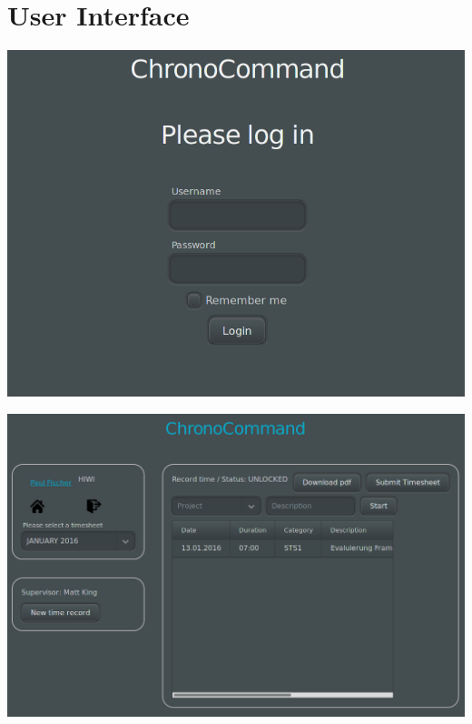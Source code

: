






\section{User Interface}
\begin{frame}
	\begin{center}
		\includegraphics[width=\linewidth,height=0.9\textheight,keepaspectratio]{images/login.png}
	\end{center}
\end{frame}

\begin{frame}
	\begin{center}
		\includegraphics[width=\linewidth,height=0.9\textheight,keepaspectratio]{images/user-defaultview.png}
	\end{center}
\end{frame}

